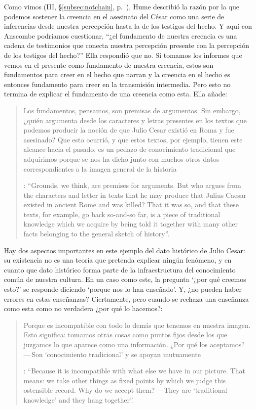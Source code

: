 Como vimos (III, \S\ref{subsec:notchain}, p.~\pageref{subsec:notchain}), Hume describió la razón por la que podemos sostener la creencia en el asesinato del César como una serie de inferencias desde nuestra percepción hasta la de los testigos del hecho.
Y aquí con Anscombe podríamos cuestionar, \enquote{¿el fundamento de nuestra creencia es una cadena de testimonios que conecta nuestra percepción presente con la percepción de los testigos del hecho?} Ella respondió que no. Si tomamos los informes que vemos en el presente como fundamento de nuestra creencia, estos son fundamentos para creer en el hecho que narran y la creencia en el hecho es entonces fundamento para creer en la transmisión intermedia. Pero esto no termina de explicar el fundamento de una creencia como esta. Ella añade: \blockquote[{\Cite[182]{anscombe2015logic:grounds}}: \enquote{Grounds, we think, are premises for arguments. But who argues from the characters and letter in texts that he may produce that Julius Caesar existed in ancient Rome and was killed? That it was so, and that these texts, for example, go back so-and-so far, is a piece of traditional knowledge which we acquire by being told it together with many other facts belonging to the general sketch of history}.]{Los fundamentos, pensamos, son premisas de argumentos. Sin embargo, ¿quién argumenta desde los caracteres y letras presentes en los textos que podemos producir la noción de que Julio Cesar existió en Roma y fue asesinado? Que esto ocurrió, y que estos textos, por ejemplo, tienen este alcance hacia el pasado, es un pedazo de conocimiento tradicional que adquirimos porque se nos ha dicho junto con muchos otros datos correspondientes a la imagen general de la historia}. Hay dos aspectos importantes en este ejemplo del dato histórico de Julio Cesar: su existencia no es una teoría que pretenda explicar ningún fenómeno, y en cuanto que dato histórico forma parte de la infraestructura del conocimiento común de nuestra cultura. En un caso como este, la pregunta \enquote*{¿por qué creemos esto?} se responde diciendo \enquote*{porque nos lo han enseñado}. Y, ¿no pueden haber errores en estas enseñanzas? Ciertamente, pero cuando se rechaza una enseñanza como esta como no verdadera ¿por qué lo hacemos?: \blockquote[{\Cite[182]{anscombe2015logic:grounds}}: \enquote{Because it is incompatible with what else we have in our picture. That means: we take other things as fixed points by which we judge this ostensible record. Why do we accept them?\,---\,They are `traditional knowledge' and they hang together}.]{Porque es incompatible con todo lo demás que tenemos en nuestra imagen. Esto significa: tomamos otras cosas como puntos fijos desde los que juzgamos lo que aparece como una información. ¿Por qué los aceptamos?\,---\,Son `conocimiento tradicional' y se apoyan mutuamente}.

